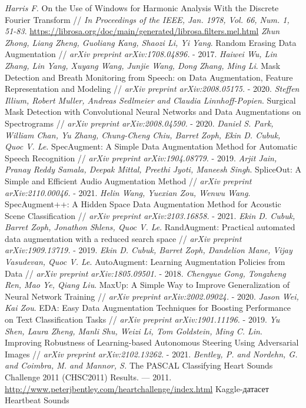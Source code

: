 \documentclass[12pt, fleqn]{article}
\begin{document}
\begin{thebibliography}{3}
    \textit{Harris F.} On the Use of Windows for Harmonic Analysis With the Discrete Fourier Transform // \textit{In Proceedings of the IEEE, Jan. 1978, Vol. 66, Num. 1, 51-83}.
    \url{https://librosa.org/doc/main/generated/librosa.filters.mel.html}
	\textit{Zhun Zhong, Liang Zheng, Guoliang Kang, Shaozi Li, Yi Yang}. Random Erasing Data Augmentation // \textit{arXiv preprint arXiv:1708.04896.} - 2017.
	\textit{Haiwei Wu, Lin Zhang, Lin Yang, Xuyang Wang, Junjie Wang, Dong Zhang, Ming Li}. Mask Detection and Breath Monitoring from Speech: on Data Augmentation,
	Feature Representation and Modeling // \textit{arXiv preprint arXiv:2008.05175.} - 2020.
	\textit{Steffen Illium, Robert Muller, Andreas Sedlmeier and Claudia Linnhoff-Popien}. Surgical Mask Detection with Convolutional Neural Networks and Data
	Augmentations on Spectrograms // \textit{arXiv preprint arXiv:2008.04590.} - 2020.
	\textit{Daniel S. Park, William Chan, Yu Zhang, Chung-Cheng Chiu, Barret Zoph, Ekin D. Cubuk, Quoc V. Le}. SpecAugment: A Simple Data Augmentation Method
	for Automatic Speech Recognition // \textit{arXiv preprint arXiv:1904.08779.} - 2019.
	\textit{Arjit Jain, Pranay Reddy Samala, Deepak Mittal, Preethi Jyoti, Maneesh Singh}. SpliceOut: A Simple and Efficient Audio Augmentation Method // \textit{arXiv preprint arXiv:2110.00046.} - 2021.
	\textit{Helin Wang, Yuexian Zou, Wenwu Wang}. SpecAugment++: A Hidden Space Data Augmentation Method for Acoustic Scene Classification // \textit{arXiv preprint arXiv:2103.16858.} - 2021.
	\textit{Ekin D. Cubuk, Barret Zoph, Jonathon Shlens, Quoc V. Le}. RandAugment: Practical automated data augmentation with a reduced search space // \textit{arXiv preprint arXiv:1909.13719.} - 2019.
	\textit{Ekin D. Cubuk, Barret Zoph, Dandelion Mane, Vijay Vasudevan, Quoc V. Le}. AutoAugment: Learning Augmentation Policies from Data // \textit{arXiv preprint arXiv:1805.09501.} - 2018.
	\textit{Chengyue Gong, Tongzheng Ren, Mao Ye, Qiang Liu}. MaxUp: A Simple Way to Improve Generalization of Neural Network Training // \textit{arXiv preprint arXiv:2002.09024.} - 2020.
	\textit{Jason Wei, Kai Zou}. EDA: Easy Data Augmentation Techniques for Boosting Performance on Text Classification Tasks // \textit{arXiv preprint arXiv:1901.11196.} - 2019.
	\textit{Yu Shen, Laura Zheng, Manli Shu, Weizi Li, Tom Goldstein, Ming C. Lin}. Improving Robustness of Learning-based Autonomous Steering Using Adversarial Images // \textit{arXiv preprint arXiv:2102.13262.} - 2021.
	\textit{Bentley, P. and Nordehn, G. and Coimbra, M. and Mannor, S.} The {PASCAL} {C}lassifying {H}eart {S}ounds {C}hallenge 2011 {(CHSC2011)} {R}esults. --- 2011.
	\url{http://www.peterjbentley.com/heartchallenge/index.html}
	Kaggle-датасет Heartbeat Sounds
	

\end{thebibliography}
\end{document}
